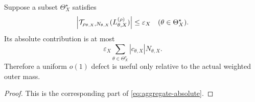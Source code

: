 \begin{proposition}
\label{prop:coefficient-mass}
Suppose a subset \(\Theta_X^\star\) satisfies
\[
 \left|
 \mathcal T_{\rho_{\theta,X},N_{\theta,X}}
 (L_{\theta,X}^{(\rho)})
 \right|
 \le\varepsilon_X
 \quad(\theta\in\Theta_X^\star).
\]
Its absolute contribution is at most
\[
 \varepsilon_X
 \sum_{\theta\in\Theta_X^\star}
 |c_{\theta,X}|N_{\theta,X}.
\]
Therefore a uniform \(o(1)\) defect is useful only relative to the
actual weighted outer mass.
\end{proposition}

\begin{proof}
This is the corresponding part of
\eqref{eq:aggregate-absolute}.
\end{proof}
